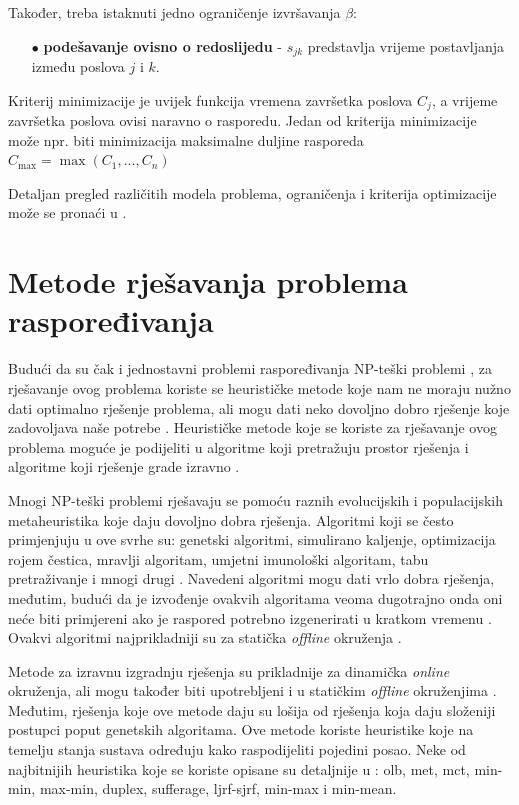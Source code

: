 \documentclass[times, utf8, seminar]{fer}
\begin{document}
Također, treba istaknuti jedno ograničenje izvršavanja $\beta$:
\begin{itemize}
   \item[$\bullet$] \textbf{podešavanje ovisno o redoslijedu} 
   - $s_{jk}$ predstavlja vrijeme postavljanja između poslova $j$ i $k$.
\end{itemize}

Kriterij minimizacije je uvijek funkcija vremena završetka poslova $C_j$, a vrijeme
završetka poslova ovisi naravno o rasporedu. Jedan od kriterija minimizacije
može npr. biti minimizacija maksimalne duljine rasporeda $C_{\max} = \max(C_1,...,C_n)$

Detaljan pregled različitih modela problema, ograničenja i kriterija optimizacije može
se pronaći u \citep{michael2018scheduling}.

\section{Metode rješavanja problema raspoređivanja}
Budući da su čak i jednostavni problemi raspoređivanja NP-teški problemi
\citep{hart2005evolutionary}, za rješavanje ovog problema koriste
se heurističke metode koje nam ne moraju nužno dati optimalno rješenje
problema, ali mogu dati neko dovoljno dobro rješenje koje zadovoljava
naše potrebe \citep{Durasevic}.
Heurističke metode koje se koriste za rješavanje ovog problema moguće je
podijeliti u algoritme koji pretražuju prostor rješenja i algoritme koji
rješenje grade izravno \citep{Durasevic}.

Mnogi NP-teški problemi rješavaju se pomoću raznih evolucijskih i
populacijskih metaheuristika koje daju dovoljno dobra rješenja.
Algoritmi koji se često primjenjuju u ove svrhe su: genetski algoritmi,
simulirano kaljenje, optimizacija rojem čestica, mravlji algoritam,
umjetni imunološki algoritam, tabu pretraživanje i mnogi drugi \citep{Durasevic, dhiflaoui2018dual, djurasevic2016comparison, hart2005evolutionary, costa2013hybrid}.
Navedeni algoritmi mogu dati vrlo dobra rješenja, međutim, budući
da je izvođenje ovakvih algoritama veoma dugotrajno onda oni neće
biti primjereni ako je raspored potrebno izgenerirati u kratkom vremenu
\citep{Durasevic}. Ovakvi algoritmi najprikladniji su za statička \textit{offline}
okruženja \citep{djurasevic2016comparison}.

Metode za izravnu izgradnju rješenja su prikladnije za dinamička
\textit{online} okruženja, ali mogu također biti upotrebljeni i u
statičkim \textit{offline} okruženjima \citep{djurasevic2016comparison}.
Međutim, rješenja koje ove metode daju su lošija od rješenja
koja daju složeniji postupci poput genetskih algoritama. Ove metode
koriste heuristike koje na temelju stanja sustava određuju kako raspodijeliti
pojedini posao. Neke od najbitnijih heuristika koje se koriste
opisane su detaljnije u \citep{Durasevic}:
olb, met, mct, min-min, max-min, duplex, sufferage, ljrf-sjrf, min-max i
min-mean.
\end{document}
